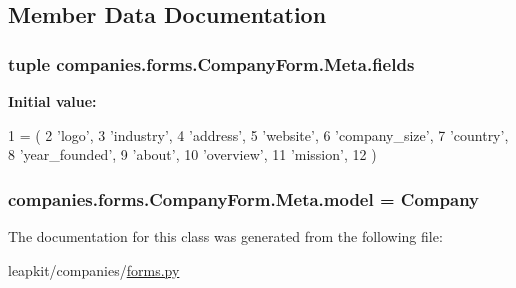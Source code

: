 \subsection{Member Data Documentation}
\hypertarget{classcompanies_1_1forms_1_1_company_form_1_1_meta_ac528327dbb0844a0517728c7a865b527}{
\subsubsection[{fields}]{\setlength{\rightskip}{0pt plus 5cm}tuple companies.\-forms.\-Company\-Form.\-Meta.\-fields\hspace{0.3cm}{\ttfamily [static]}}}\label{classcompanies_1_1forms_1_1_company_form_1_1_meta_ac528327dbb0844a0517728c7a865b527}
{\bfseries Initial value\-:}
\begin{DoxyCode}
1 = (
2             \textcolor{stringliteral}{'logo'},
3             \textcolor{stringliteral}{'industry'},
4             \textcolor{stringliteral}{'address'},
5             \textcolor{stringliteral}{'website'},
6             \textcolor{stringliteral}{'company\_size'},
7             \textcolor{stringliteral}{'country'},
8             \textcolor{stringliteral}{'year\_founded'},
9             \textcolor{stringliteral}{'about'},
10             \textcolor{stringliteral}{'overview'},
11             \textcolor{stringliteral}{'mission'},
12         )
\end{DoxyCode}
\hypertarget{classcompanies_1_1forms_1_1_company_form_1_1_meta_a8d3f48c3b4d80e9f0dc8b1a508982fc5}{
\subsubsection[{model}]{\setlength{\rightskip}{0pt plus 5cm}companies.\-forms.\-Company\-Form.\-Meta.\-model = Company\hspace{0.3cm}{\ttfamily [static]}}}\label{classcompanies_1_1forms_1_1_company_form_1_1_meta_a8d3f48c3b4d80e9f0dc8b1a508982fc5}


The documentation for this class was generated from the following file\-:\begin{DoxyCompactItemize}
\item 
leapkit/companies/\hyperlink{companies_2forms_8py}{forms.\-py}\end{DoxyCompactItemize}
